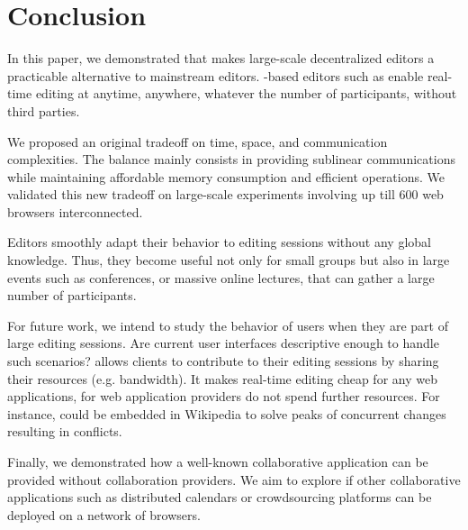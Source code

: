 
\section{Conclusion}
\label{sec:conclusion}

In this paper, we demonstrated that \LSEQ makes large-scale decentralized
editors a practicable alternative to mainstream editors. \LSEQ-based editors
such as \CRATE enable real-time editing at anytime, anywhere, whatever the number
of participants, without third parties.

We proposed an original tradeoff on time, space, and communication
complexities. The balance mainly consists in providing sublinear communications
while maintaining affordable memory consumption and efficient operations.  We
validated this new tradeoff on large-scale experiments involving up till 600 web
browsers interconnected.

Editors smoothly adapt their behavior to editing sessions without any global
knowledge. Thus, they become useful not only for small groups but also in large
events such as conferences, or massive online lectures, that can gather a large
number of participants.

For future work, we intend to study the behavior of users when they are part of
large editing sessions. Are current user interfaces descriptive enough to handle
such scenarios?  \CRATE allows clients to contribute to their editing sessions
by sharing their resources (e.g. bandwidth).  It makes real-time editing cheap
for any web applications, for web application providers do not spend further
resources. For instance, \CRATE could be embedded in Wikipedia to solve peaks of
concurrent changes resulting in
conflicts. %

Finally, we demonstrated how a well-known collaborative application can be
provided without collaboration providers. We aim to explore if other
collaborative applications such as distributed calendars or crowdsourcing
platforms can be deployed on a network of browsers.




